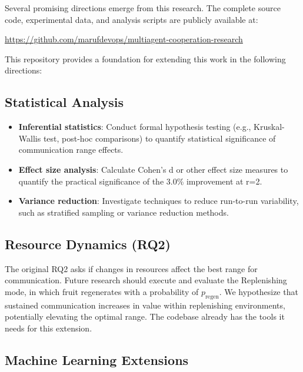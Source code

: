 Several promising directions emerge from this research. The complete source code, experimental data, and analysis scripts are publicly available at:

\begin{center}
\url{https://github.com/marufdevops/multiagent-cooperation-research}
\end{center}

This repository provides a foundation for extending this work in the following directions:

\subsection{Statistical Analysis}

\begin{itemize}
    \item \textbf{Inferential statistics}: Conduct formal hypothesis testing (e.g., Kruskal-Wallis test, post-hoc comparisons) to quantify statistical significance of communication range effects.

    \item \textbf{Effect size analysis}: Calculate Cohen's d or other effect size measures to quantify the practical significance of the 3.0\% improvement at r=2.

    \item \textbf{Variance reduction}: Investigate techniques to reduce run-to-run variability, such as stratified sampling or variance reduction methods.
\end{itemize}

\subsection{Resource Dynamics (RQ2)}

The original RQ2 asks if changes in resources affect the best range for communication. Future research should execute and evaluate the Replenishing mode, in which fruit regenerates with a probability of $p_{\text{regen}}$. We hypothesize that sustained communication increases in value within replenishing environments, potentially elevating the optimal range. The codebase already has the tools it needs for this extension.

\subsection{Machine Learning Extensions}

